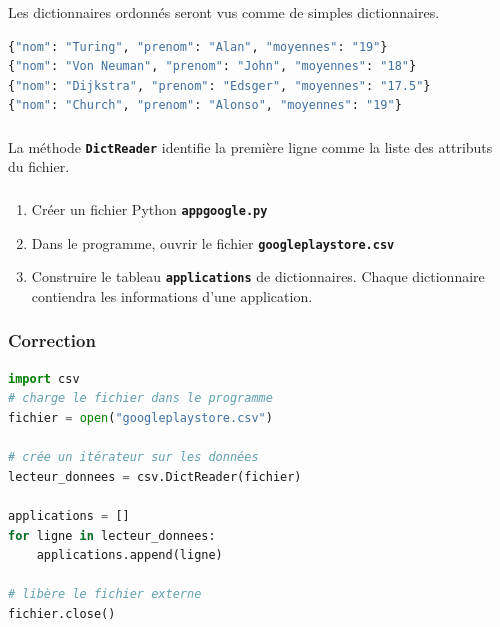 \documentclass[svgnames,11pt]{beamer}
\begin{document}
\begin{frame}[fragile]
    \frametitle{}
    \begin{aretenir}[Remarque]
        Les dictionnaires ordonnés seront vus comme de simples dictionnaires.
    \end{aretenir}
    \begin{center}
        \begin{lstlisting}[language=Python, xleftmargin=0.3em,xrightmargin=-4em,basicstyle=\ttfamily\small]
{"nom": "Turing", "prenom": "Alan", "moyennes": "19"}
{"nom": "Von Neuman", "prenom": "John", "moyennes": "18"}
{"nom": "Dijkstra", "prenom": "Edsger", "moyennes": "17.5"}
{"nom": "Church", "prenom": "Alonso", "moyennes": "19"}
\end{lstlisting}
        \label{CODE}
    \end{center}

\end{frame}
\begin{frame}
    \frametitle{}

    \begin{aretenir}[Remarque]
        La méthode \textbf{\texttt{DictReader}} identifie la première ligne comme la liste des attributs du fichier.
    \end{aretenir}

\end{frame}
\begin{frame}
    \frametitle{}

    \begin{activite}
        \begin{enumerate}
            \item Créer un fichier Python \texttt{\textbf{appgoogle.py}}
            \item Dans le programme, ouvrir le fichier \texttt{\textbf{googleplaystore.csv}}
            \item Construire le tableau \textbf{\texttt{applications}} de dictionnaires. Chaque dictionnaire contiendra les informations d'une application.
        \end{enumerate}
    \end{activite}


\end{frame}

\begin{frame}[fragile]
    \frametitle{Correction}

    \begin{center}
        \begin{lstlisting}[language=Python, xleftmargin=1em,xrightmargin=1em,basicstyle=\ttfamily\small]
import csv
# charge le fichier dans le programme
fichier = open("googleplaystore.csv")

# crée un itérateur sur les données
lecteur_donnees = csv.DictReader(fichier)

applications = []
for ligne in lecteur_donnees:
    applications.append(ligne)

# libère le fichier externe
fichier.close()
\end{lstlisting}
    \end{center}

\end{frame}
\end{document}
